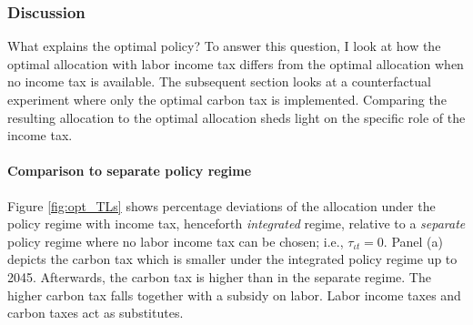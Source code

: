 \subsubsection{Discussion}\label{subsec:dis}

 What explains the optimal policy? To answer this question, I look at how the optimal allocation with labor income tax differs from the optimal allocation when no income tax is available. 
 The subsequent section looks at a counterfactual experiment where only the optimal carbon tax is implemented. Comparing the resulting allocation to the optimal allocation sheds light on the specific role of the income tax. 


	
\paragraph{Comparison to separate policy regime}

Figure \ref{fig:opt_TLs} shows percentage deviations of the allocation under the policy regime with income tax, henceforth \textit{integrated} regime, relative to a \textit{separate} policy regime where no labor income tax can be chosen; i.e., $\tau_{\iota t}=0$.  
Panel (a) depicts the carbon tax which is smaller under the integrated policy regime up to 2045. Afterwards, the carbon tax is higher than in the separate regime. The higher carbon tax falls together with a subsidy on labor.
Labor income taxes and carbon taxes act as substitutes. 


